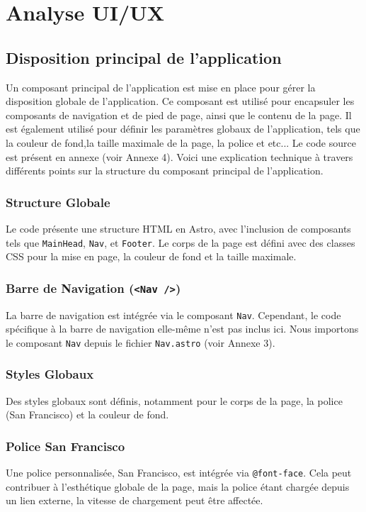 \documentclass[12pt, a4paper, oneside]{thesis}
\begin{document}
\newpage
\section{Analyse UI/UX}

\subsection{Disposition principal de l'application}

Un composant principal de l'application est mise en place pour gérer la disposition globale de l'application. Ce composant est utilisé pour encapsuler les composants de navigation et de pied de page, ainsi que le contenu de la page. Il est également utilisé pour définir les paramètres globaux de l'application, tels que la couleur de fond,la taille maximale de la page, la police et etc... \newline
Le code source est présent en annexe (voir Annexe 4). Voici une explication technique à travers différents points sur la structure du composant principal de l'application.

\subsubsection{Structure Globale}
Le code présente une structure HTML en Astro, avec l'inclusion de composants tels que \texttt{MainHead}, \texttt{Nav}, et \texttt{Footer}. Le corps de la page est défini avec des classes CSS pour la mise en page, la couleur de fond et la taille maximale.

\subsubsection{Barre de Navigation (\texttt{<Nav />})}
La barre de navigation est intégrée via le composant \texttt{Nav}. Cependant, le code spécifique à la barre de navigation elle-même n'est pas inclus ici. 
Nous importons le composant \texttt{Nav} depuis le fichier \texttt{Nav.astro} (voir Annexe 3).

\subsubsection{Styles Globaux}
Des styles globaux sont définis, notamment pour le corps de la page, la police (San Francisco) et la couleur de fond. 
\subsubsection{Police San Francisco}
Une police personnalisée, San Francisco, est intégrée via \texttt{@font-face}. Cela peut contribuer à l'esthétique globale de la page, mais la police étant chargée depuis un lien externe, la vitesse de chargement peut être affectée.
\end{document}
